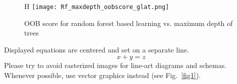 \documentclass[runningheads]{llncs}
\begin{document}
\begin{figure}{H}
\texttt{[image: Rf\_maxdepth\_oobscore\_glat.png]}
\caption{OOB score for random forest based learning vs. maximum depth of trees}
\end{figure}



\noindent Displayed equations are centered and set on a separate
line.
\begin{equation}
x + y = z
\end{equation}
Please try to avoid rasterized images for line-art diagrams and
schemas. Whenever possible, use vector graphics instead (see
Fig.~\ref{fig1}).

\end{document}
